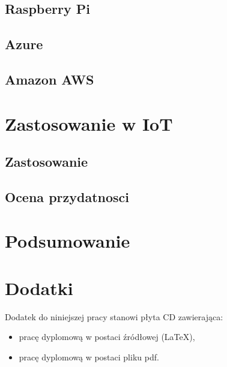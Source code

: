 \documentclass[11pt, a4paper,polish,twoside]{report}
\begin{document}
\section{Raspberry Pi}
\section{Azure}
\section{Amazon AWS}
%

\chapter{Zastosowanie w IoT}
\section{Zastosowanie}
\section{Ocena przydatnosci}

\chapter{Podsumowanie}
%




\nocite{*}
\printbibliography 


\chapter*{Dodatki}
Dodatek do niniejszej pracy stanowi płyta CD zawierająca:
\begin{itemize}
\item pracę dyplomową w postaci źródłowej (LaTeX),
\item pracę dyplomową w postaci pliku pdf.
\end{itemize}

\newpage
{}	
\listoffigures

\newpage
{}	
\listoftables

\end{document}
